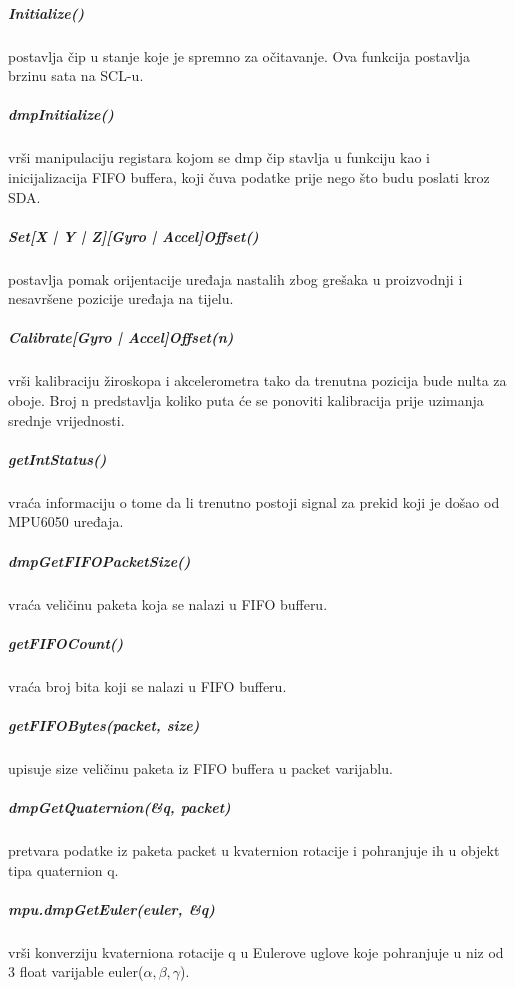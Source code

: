 \documentclass[../Document.tex]{subfiles}
\begin{document}
\subparagraph{Initialize()} \noindent postavlja čip u stanje koje je spremno za očitavanje. Ova funkcija postavlja brzinu sata na SCL-u.

\subparagraph{dmpInitialize()} \noindent vrši manipulaciju registara kojom se dmp čip stavlja u funkciju kao i inicijalizacija FIFO buffera, koji čuva podatke prije nego što budu poslati kroz SDA.

\subparagraph{Set[X | Y | Z][Gyro | Accel]Offset()} \noindent postavlja pomak orijentacije uređaja nastalih zbog grešaka u proizvodnji i nesavršene pozicije uređaja na tijelu.

\subparagraph{Calibrate[Gyro | Accel]Offset(n)} \noindent vrši kalibraciju žiroskopa i akcelerometra tako da trenutna pozicija bude nulta za oboje. Broj n predstavlja koliko puta će se ponoviti kalibracija prije uzimanja srednje vrijednosti.

\subparagraph{getIntStatus()} \noindent vraća informaciju o tome da li trenutno postoji signal za prekid koji je došao od MPU6050 uređaja.

\subparagraph{dmpGetFIFOPacketSize()} \noindent vraća veličinu paketa koja se nalazi u FIFO bufferu.

\subparagraph{getFIFOCount()} \noindent vraća broj bita koji se nalazi u FIFO bufferu.

\subparagraph{getFIFOBytes(packet, size)} \noindent upisuje size veličinu paketa iz FIFO buffera u packet varijablu.

\subparagraph{dmpGetQuaternion(\&q, packet)} \noindent pretvara podatke iz paketa packet u kvaternion rotacije i pohranjuje ih u objekt tipa quaternion q.

\subparagraph{mpu.dmpGetEuler(euler, \&q)} \noindent vrši konverziju kvaterniona rotacije q u Eulerove uglove koje pohranjuje u niz od 3 float varijable euler($\alpha,\beta,\gamma$).
\end{document}
